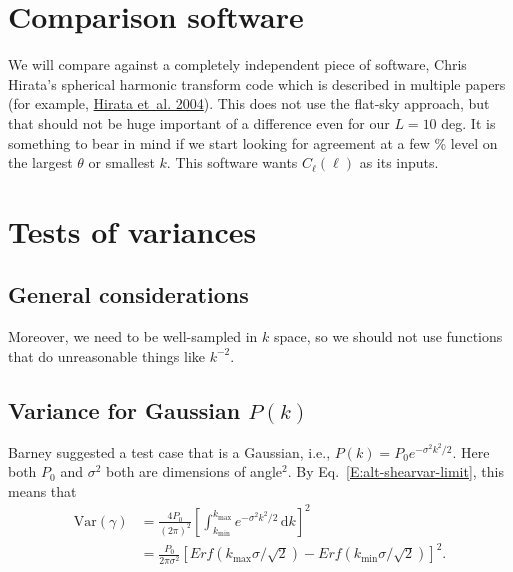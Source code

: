 \documentclass[preprint]{aastex}
\newcommand{\kmax}{\ensuremath{k_\mathrm{max}}}
\newcommand{\kmin}{\ensuremath{k_\mathrm{min}}}
\newcommand{\rmd}{\ensuremath{\mathrm{d}}}
\begin{document}
\section{Comparison software}\label{S:comparison}

We will compare against a completely independent piece of software,
Chris Hirata's spherical harmonic transform code which is described in
multiple papers (for example,
\href{http://adsabs.harvard.edu/abs/2004PhRvD..70j3501H}{Hirata
  et~al. 2004}).  This does not use the flat-sky
approach, but that should not be huge important of a difference even
for our $L=10$ deg.  It is something to bear in mind if we start
looking for agreement at a few \% level on the largest $\theta$ or
smallest $k$.  This software wants $C_\ell(\ell)$ as its inputs.

\section{Tests of variances}\label{S:testvar}

\subsection{General considerations}

Moreover, we need to be well-sampled in $k$ space, so we should not
use functions that do unreasonable things like $k^{-2}$.

\subsection{Variance for Gaussian $P(k)$}

Barney suggested a test case that is a Gaussian, i.e., $P(k) =
P_0 e^{-\sigma^2 k^2 / 2}$.  Here both $P_0$ and $\sigma^2$ both
are dimensions of angle$^2$.  By Eq.~\ref{E:alt-shearvar-limit}, this means that
\begin{align}
\mathrm{Var}(\gamma) &= \frac{4P_0}{(2\pi)^2} \left[\int_{\kmin}^{\kmax} 
e^{-\sigma^2 k^2/2} \,\rmd k\right]^2 \\
 &= \frac{P_0}{2\pi\sigma^2}\left[ Erf(\kmax\sigma/\sqrt{2}) - Erf(\kmin\sigma/\sqrt{2})\right]^2.
\end{align}
\end{document}
